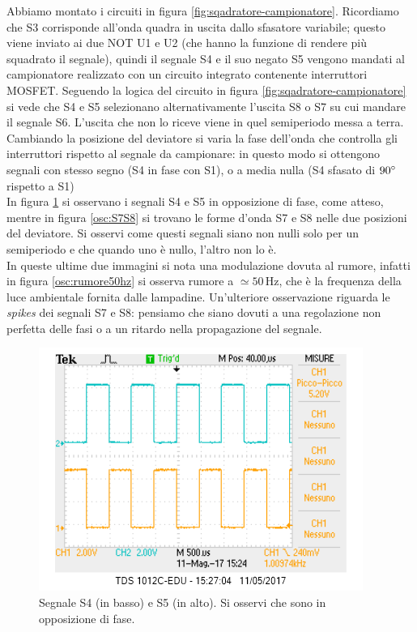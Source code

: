 \documentclass[10pt,a4paper]{article}
\begin{document}
Abbiamo montato i circuiti in figura \ref{fig:sqadratore-campionatore}. Ricordiamo che S3 corrisponde all'onda quadra in uscita dallo sfasatore variabile; questo viene inviato ai due NOT U1 e U2 (che hanno la funzione di rendere più squadrato il segnale), quindi il segnale S4 e il suo negato S5 vengono mandati al campionatore realizzato con un circuito integrato contenente interruttori MOSFET. Seguendo la logica del circuito in figura \ref{fig:sqadratore-campionatore} si vede che S4 e S5 selezionano alternativamente l'uscita S8 o S7 su cui mandare il segnale S6. L'uscita che non lo riceve viene in quel semiperiodo messa a terra.
Cambiando la posizione del deviatore si varia la fase dell'onda che controlla gli interruttori rispetto al segnale da campionare: in questo modo si ottengono segnali con stesso segno (S4 in fase con S1), o a media nulla (S4 sfasato di $90 \degree $ rispetto a S1)\\
In figura \ref{osc:s4s5} si osservano i segnali S4 e S5 in opposizione di fase, come atteso, mentre in figura \ref{osc:S7S8} si trovano le forme d'onda S7 e S8 nelle due posizioni del deviatore. Si osservi come questi segnali siano non nulli solo per un semiperiodo e che quando uno è nullo, l'altro non lo è.\\ In queste ultime due immagini si nota una modulazione dovuta al rumore, infatti in figura \ref{osc:rumore50hz} si osserva rumore a $\simeq 50\,\mbox{Hz}$, che è la frequenza della luce ambientale fornita dalle lampadine. %
Un'ulteriore osservazione riguarda le \emph{spikes} dei segnali S7 e S8: pensiamo che siano dovuti a una regolazione non perfetta delle fasi o a un ritardo nella propagazione del segnale.

\begin{figure}
\centering
\includegraphics[scale=0.7]{CH1S4-CH2S5.png}
\caption{Segnale S4 (in basso) e S5 (in alto). Si osservi che sono in opposizione di fase.\label{osc:s4s5}}
\end{figure}
\end{document}
